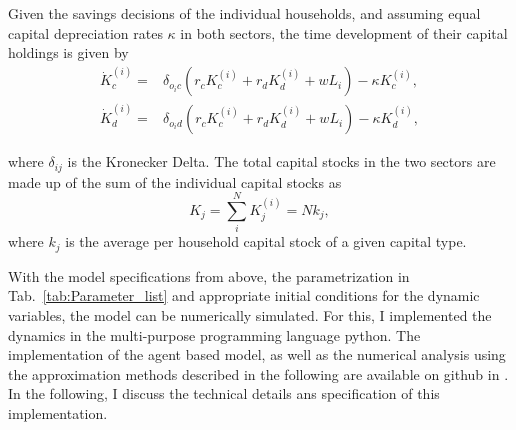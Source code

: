 Given the savings decisions of the individual households, and assuming equal capital depreciation rates $\kappa$ in both sectors, the time development of their capital holdings is given by
\begin{align}
  \dot{K}_c^{(i)} =& \delta_{o_ic} \left( r_c K_c^{(i)} + r_d K_d^{(i)} + w L_i \right) - \kappa K_c^{(i)}, \label{eq:clean_investment}\\
  \dot{K}_d^{(i)} =& \delta_{o_id} \left( r_c K_c^{(i)} + r_d K_d^{(i)} + w L_i \right) - \kappa K_d^{(i)}, \label{eq:dirty_investment}
\end{align}

where $\delta_{ij}$ is the Kronecker Delta. The total capital stocks in the two sectors are made up of the sum of the individual capital stocks as
\begin{equation}
K_j = \sum_i^N K_j^{(i)} = N k_j,
\end{equation}
where $k_j$ is the average per household capital stock of a given capital type.


With the model specifications from above, the parametrization in Tab.~\ref{tab:Parameter_list} and appropriate initial conditions for the dynamic variables, the model can be numerically simulated.
For this, I implemented the dynamics in the multi-purpose programming language python. The implementation of the agent based model, as well as the numerical analysis using the approximation methods described in the following are available on github in \cite{kolb2018}.
In the following, I discuss the technical details ans specification of this implementation.

